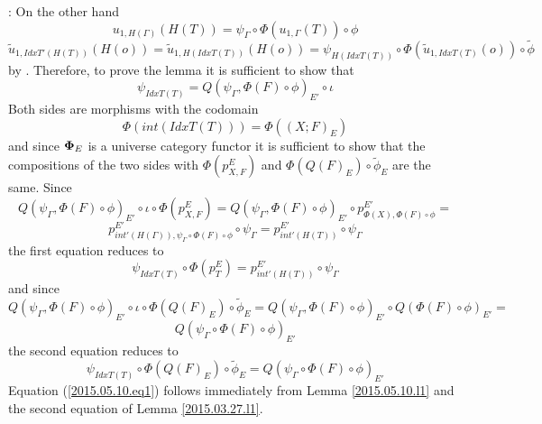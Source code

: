 \documentclass[12pt]{article}
\newenvironment{eq}{\begin{equation}}{\end{equation}}
\newenvironment{myproof}{{\bf Proof}:}{\vskip 5mm }
\newcommand{\llabel}[1]{\label{#1}}
\newcommand{\wt}{\widetilde}
\begin{document}
\begin{myproof}
On the other hand 
%
$$u_{1,H(\Gamma)}(H(T))=\psi_{\Gamma}\circ \Phi(u_{1,\Gamma}(T))\circ \phi$$
$$\wt{u}_{1,IdxT'(H(T))}(H(o))=\wt{u}_{1,H(IdxT(T))}(H(o))=\psi_{H(IdxT(T))}\circ \Phi(\wt{u}_{1,IdxT(T)}(o))\circ \wt{\phi}$$
%
by \cite[Lemma 6.1(1,2)]{fromunivwithPi}. Therefore, to prove the lemma it is sufficient to show that
%
$$\psi_{IdxT(T)}=Q(\psi_{\Gamma},\Phi(F)\circ\phi)_{E'}\circ\iota$$
%
Both sides are morphisms with the codomain 
%
$$\Phi(int(IdxT(T)))=\Phi((X;F)_E)$$
%
and since ${\bf\Phi}_E$ is a universe category functor it is sufficient to show that the compositions of the two sides with $\Phi(p^E_{X,F})$ and $\Phi(Q(F)_E)\circ \wt{\phi}_E$ are the same. Since
%
$$Q(\psi_{\Gamma},\Phi(F)\circ\phi)_{E'}\circ\iota\circ \Phi(p^E_{X,F})=Q(\psi_{\Gamma},\Phi(F)\circ\phi)_{E'}\circ p^{E'}_{\Phi(X),\Phi(F)\circ\phi}=$$
$$p^{E'}_{int'(H(\Gamma)),\psi_{\Gamma}\circ \Phi(F)\circ\phi}\circ\psi_{\Gamma}=p^{E'}_{int'(H(T))}\circ\psi_{\Gamma}$$
%
the first equation reduces to
%
\begin{eq}
\llabel{2015.05.10.eq1}
\psi_{IdxT(T)}\circ \Phi(p^E_{T})=p^{E'}_{int'(H(T))}\circ\psi_{\Gamma}
\end{eq}
%
and since
%
$$Q(\psi_{\Gamma},\Phi(F)\circ\phi)_{E'}\circ\iota\circ \Phi(Q(F)_E)\circ \wt{\phi}_E=Q(\psi_{\Gamma},\Phi(F)\circ\phi)_{E'}\circ Q(\Phi(F)\circ\phi)_{E'}=$$$$Q(\psi_{\Gamma}\circ \Phi(F)\circ \phi)_{E'}$$
%
the second equation reduces to
%
\begin{eq}
\llabel{2015.05.10.eq2.0}
\psi_{IdxT(T)}\circ \Phi(Q(F)_E)\circ \wt{\phi}_E=Q(\psi_{\Gamma}\circ \Phi(F)\circ \phi)_{E'}
\end{eq}
%
Equation (\ref{2015.05.10.eq1}) follows immediately from Lemma \ref{2015.05.10.l1} and the second equation of Lemma \ref{2015.03.27.l1}.


\end{myproof}
\end{document}
